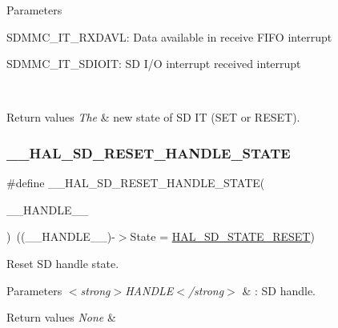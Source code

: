 \begin{DoxyParams}{Parameters}
\begin{DoxyItemize}
S\+D\+M\+M\+C\+\_\+\+I\+T\+\_\+\+R\+X\+D\+A\+VL\+: Data available in receive F\+I\+FO interrupt \item S\+D\+M\+M\+C\+\_\+\+I\+T\+\_\+\+S\+D\+I\+O\+IT\+: SD I/O interrupt received interrupt \end{DoxyItemize}
\\
\hline
\end{DoxyParams}

\begin{DoxyRetVals}{Return values}
{\em The} & new state of SD IT (S\+ET or R\+E\+S\+ET). \\
\hline
\end{DoxyRetVals}
\mbox{\label{group___s_d___exported__macros_ga2a5557d59e36f15d84d41a4cd3832984}} 
\subsubsection{\texorpdfstring{\_\_HAL\_SD\_RESET\_HANDLE\_STATE}{\_\_HAL\_SD\_RESET\_HANDLE\_STATE}}
{\footnotesize\ttfamily \#define \+\_\+\+\_\+\+H\+A\+L\+\_\+\+S\+D\+\_\+\+R\+E\+S\+E\+T\+\_\+\+H\+A\+N\+D\+L\+E\+\_\+\+S\+T\+A\+TE(\begin{DoxyParamCaption}\item[{}]{\+\_\+\+\_\+\+H\+A\+N\+D\+L\+E\+\_\+\+\_\+ }\end{DoxyParamCaption})~((\+\_\+\+\_\+\+H\+A\+N\+D\+L\+E\+\_\+\+\_\+)-\/$>$State = \mbox{\hyperlink{group___s_d___exported___types___group1_gga0012126bcdfea270fe367bfaec2692baaa6dd140391c3c9377280e2f262b24343}{H\+A\+L\+\_\+\+S\+D\+\_\+\+S\+T\+A\+T\+E\+\_\+\+R\+E\+S\+ET}})}



Reset SD handle state. 


\begin{DoxyParams}{Parameters}
{\em $<$strong$>$\+H\+A\+N\+D\+L\+E$<$/strong$>$} & \+: SD handle. \\
\hline
\end{DoxyParams}

\begin{DoxyRetVals}{Return values}
{\em None} & \\
\hline
\end{DoxyRetVals}
